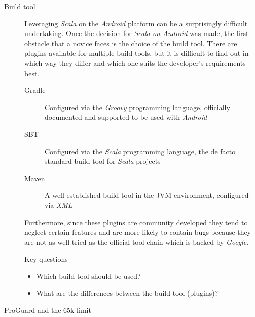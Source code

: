 \begin{description}

	\item[Build tool]\hfill

	Leveraging \textit{Scala} on the \textit{Android} platform can be a surprisingly difficult undertaking. Once the decision for \textit{Scala on Android} was made, the  first obstacle that a novice faces is the choice of the build tool. There are plugins available for multiple build tools, but it is difficult to find out in which way they differ and which one suits the developer's requirements best.

	\begin{description}

		\item[Gradle]\hfill

		Configured via the \textit{Groovy} programming language, officially documented and supported to be used with \textit{Android}

		\item[\ac{SBT}]\hfill

		Configured via the \textit{Scala} programming language, the de facto standard build-tool for \textit{Scala} projects

		\item[Maven]\hfill

		A well established build-tool in the \ac{JVM} environment, configured via \textit{XML}

	\end{description}

	Furthermore, since these plugins are community developed they tend to neglect certain features and are more likely to contain bugs because they are not as well-tried as the official tool-chain which is backed by \textit{Google}.

	\begin{highlight}{Key questions}

		\begin{itemize}

			\item Which build tool should be used?

			\item What are the differences between the build tool (plugins)?

		\end{itemize}

	\end{highlight}

	\item[ProGuard and the 65k-limit]\hfill


\end{description}
